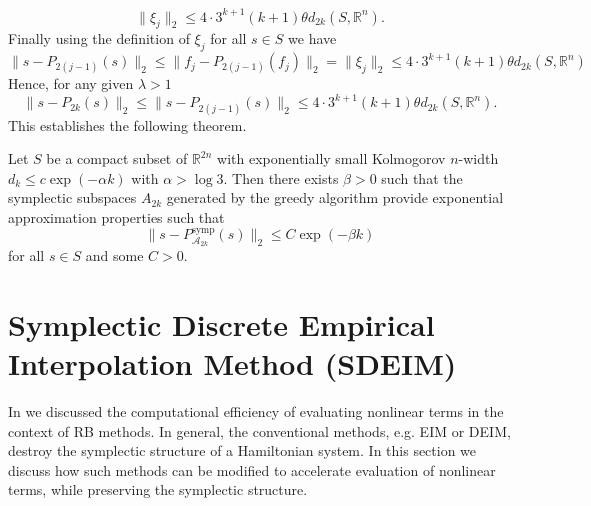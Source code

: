 \begin{equation} \label{eq:new20}
	\| \xi_j \|_2 \leq 4\cdot 3^{k+1} (k+1) \theta d_{2k}(S,\mathbb R^n).
\end{equation}
Finally using the definition of $\xi_j$ for all $s\in S$ we have
\begin{equation} \label{eq:new21}
	\| s - P_{2(j-1)}(s) \|_2 \leq \| f_j - P_{2(j-1)}(f_j) \|_2 = \|\xi_j \|_2 \leq 4\cdot 3^{k+1} (k+1) \theta d_{2k}(S,\mathbb R^n)
\end{equation}
Hence, for any given $\lambda > 1$
\begin{equation} \label{eq:new22}
	\| s - P_{2k}(s) \|_2 \leq \| s - P_{2(j-1)}(s) \|_2 \leq 4\cdot 3^{k+1} (k+1) \theta d_{2k}(S,\mathbb R^n).
\end{equation}
This establishes the following theorem.
\begin{theorem} \label{theorem:SyMo:2}
	Let $S$ be a compact subset of $\mathbb{R}^{2n}$ with exponentially small Kolmogorov $n$-width $d_{k}\leq c\exp(-\alpha k)$ with $\alpha > \log3$. Then there exists $\beta>0$ such that the symplectic subspaces $A_{2k}$ generated by the greedy algorithm provide exponential approximation properties such that
\begin{equation} \label{eq:new23}
	\| s - P^{\text{symp}}_{\mathcal A_{2k}}(s) \|_2 \leq C \exp(-\beta k)
\end{equation}
for all $s\in S$ and some $C>0$.
\end{theorem}

\section{Symplectic Discrete Empirical Interpolation Method (SDEIM)} \label{sec:3.6}
In  we discussed the computational efficiency of evaluating nonlinear terms in the context of RB methods. In general, the conventional methods, e.g. EIM or DEIM, destroy the symplectic structure of a Hamiltonian system. In this section we discuss how such methods can be modified to accelerate evaluation of nonlinear terms, while preserving the symplectic structure.

